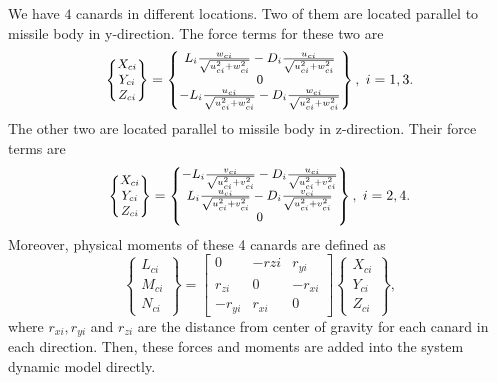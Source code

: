 \documentclass[letterpaper, 10 pt, conference]{ieeeconf}  %
\begin{document}
We have $4$ canards in different locations. Two of them are located parallel to missile  body in y-direction. The force terms for these two are
\begin{equation}\small
\begin{Bmatrix}
X_{ci} \\ Y_{ci} \\ Z_{ci} 
\end{Bmatrix}
=
\begin{Bmatrix}
L_i \frac{w_{ci}}{\sqrt{u_{ci}^2+w_{ci}^2}}-D_i \frac{u_{ci}}{\sqrt{u_{ci}^2+w_{ci}^2}} \\ 0 \\ -L_i \frac{u_{ci}}{\sqrt{u_{ci}^2+w_{ci}^2}}-D_i \frac{w_{ci}}{\sqrt{u_{ci}^2+w_{ci}^2}}
\end{Bmatrix},
\ i={1,3}.
\end{equation}
The other two are located parallel to missile body in z-direction. Their force terms are
\begin{equation}\small
\begin{Bmatrix}
X_{ci} \\ Y_{ci} \\ Z_{ci} 
\end{Bmatrix}
=
\begin{Bmatrix}
-L_i \frac{v_{ci}}{\sqrt{u_{ci}^2+v_{ci}^2}}-D_i \frac{u_{ci}}{\sqrt{u_{ci}^2+v_{ci}^2}} \\ L_i \frac{u_{ci}}{\sqrt{u_{ci}^2+v_{ci}^2}}-D_i \frac{v_{ci}}{\sqrt{u_{ci}^2+v_{ci}^2}} \\ 0
\end{Bmatrix},
\ i={2,4}.
\end{equation}
Moreover, physical moments of these 4 canards are defined as
\begin{equation}
\begin{Bmatrix}
L_{ci} \\ M_{ci} \\ N_{ci} 
\end{Bmatrix}
=
\begin{bmatrix}
0 & -r{zi} & r_{yi}\\ r_{zi} & 0 & -r_{xi}\\ -r_{yi} &r_{xi} & 0
\end{bmatrix}
\begin{Bmatrix}
X_{ci} \\  Y_{ci} \\ Z_{ci}
\end{Bmatrix},
\label{eqn:canend}
\end{equation}
where $r_{xi}, r_{yi}$ and $r_{zi}$ are the distance from center of gravity for each canard in each direction. Then, these forces and moments are added into the system dynamic model directly.
\end{document}
